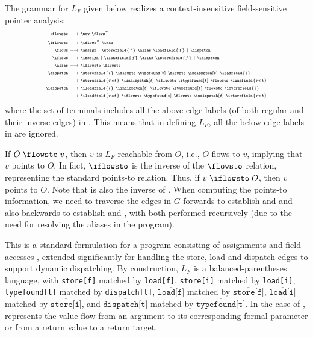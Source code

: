 The grammar for 
$L_F$ given below realizes a context-insensitive
field-sensitive pointer analysis:
\begin{equation}
\label{eqn:newLF}
\tiny
\begin{split} 
\flowsto & \longrightarrow \new ~ \flows^* \\
\iflowsto & \longrightarrow \iflows^* ~ \inew \\
\flows & \longrightarrow \assign \mid  \storefield{f} \ \alias \ \loadfield{f} \mid \dispatch\\
\iflows & \longrightarrow \iassign \mid \iloadfield{f}\ \alias \ \istorefield{f} \mid \idispatch \\
\alias & \longrightarrow \iflowsto\ \flowsto \\
\dispatch & \longrightarrow \storefield{i} \ \iflowsto \ \typefound[t] \ \flowsto \ \indispatch[t] \ \loadfield{i} \\
            & \longrightarrow \storefield{ret} \ \iindispatch[t] \ \iflowsto \ \itypefound[t] \ \flowsto \ \loadfield{ret}  \\ 
\idispatch & \longrightarrow \iloadfield{i} \ \iindispatch[t] \ \iflowsto \ \itypefound[t] \ \flowsto \ \istorefield{i}  \\
            & \longrightarrow \iloadfield{ret} \ \iflowsto \ \typefound[t] \ \flowsto \ \indispatch[t] \ \istorefield{ret} 
\end{split}
\end{equation}
where the set of terminals includes all the above-edge labels
 (of both regular and their inverse edges) in \pag. 
This means that in
defining $L_F$, all the below-edge labels in \pag are ignored.

If $O\; \flowsto\; v$,  then $v$ is
$L_F$-reachable from $O$, i.e., $O$ flows to $v$, implying that $v$ points to $O$.
In fact, $\iflowsto$ is the inverse of the $\flowsto$ relation, representing
the standard points-to relation. Thus,
if $v\; \iflowsto\; O$,  then $v$ points to $O$.
Note that \iflows is  also the
inverse of \flows. When computing the points-to information, we need
to traverse the edges in $G$ forwards to establish \flowsto and
\flows and also backwards to establish \iflowsto and \iflows, with both
performed recursively (due to the need for resolving the aliases in the
program).

This is a standard formulation for a program consisting of assignments and field accesses \cite{sridharan2006refinement}, 
extended significantly for handling the \textsf{store}, \textsf{load} and \textsf{dispatch} edges to
support dynamic dispatching. By construction, $L_F$ is a balanced-parentheses language,
with \texttt{store[f]} matched by \texttt{load[f]},
\texttt{store[i]} matched by \texttt{load[i]},
\texttt{typefound[t]} matched by \texttt{dispatch[t]},
$\overline{\texttt{load[f]}}$ matched by $\overline{\texttt{store[f]}}$,
$\overline{\texttt{load[i]}}$ matched by $\overline{\texttt{store[i]}}$, and
$\overline{\texttt{dispatch[t]}}$ matched by $\overline{\texttt{typefound[t]}}$.
In the case of \flows, \dispatch represents the value flow from an argument to its corresponding formal parameter or from a return value to a return target.

